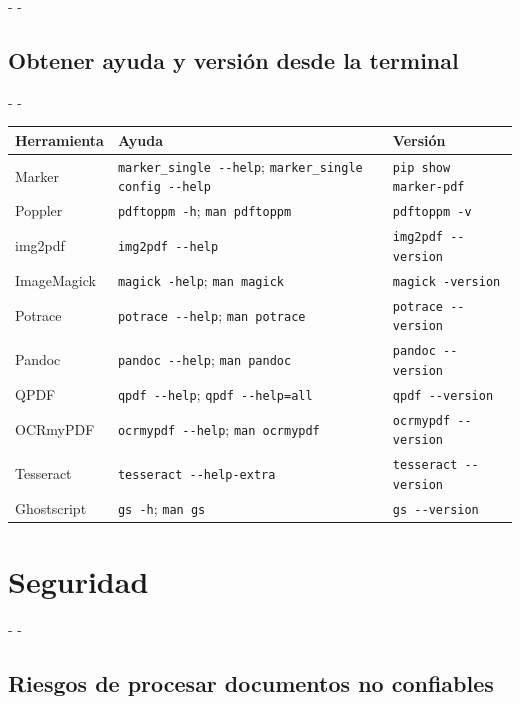 \documentclass[11pt,a4paper]{article}
\makeatletter
\newcommand{\necesitaespacio}[1]{\par\penalty-100\begingroup
	\setlength{\dimen@}{#1}\dimen@ii\pagegoal\advance\dimen@ii-\pagetotal
	\ifdim\dimen@>\dimen@ii\ifdim\dimen@ii>\z@\vfil\fi\penalty-\@M\fi\endgroup}
\newcommand{\cmd}[1]{\texttt{\textcolor{colcmd}{#1}}}      %
\newcommand{\cab}[1]{\textbf{#1}}
\makeatother
\begin{document}
	\necesitaespacio{22\baselineskip}
	\subsection{Obtener ayuda y versión desde la terminal}
	
	\begingroup\small
	\necesitaespacio{18\baselineskip}
	\begin{longtable}{L{2.6cm}L{6.06cm}L{6.4cm}}
		\toprule{}\cab{Herramienta} & \cab{Ayuda} & \cab{Versión}\\\midrule
		\endfirsthead
		\bottomrule
		\endfoot
		Marker & \cmd{marker\_\allowbreak{}single -{}-help}; \cmd{marker\_\allowbreak{}single config -{}-help} & \cmd{pip show marker-\allowbreak{}pdf}\\*
		Poppler & \cmd{pdftoppm -h}; \cmd{man pdftoppm} & \cmd{pdftoppm -v}\\
		img2pdf & \cmd{img2pdf -{}-help} & \cmd{img2pdf -{}-version}\\
		ImageMagick & \cmd{magick -help}; \cmd{man magick} & \cmd{magick -version}\\
		Potrace & \cmd{potrace -{}-help}; \cmd{man potrace} & \cmd{potrace -{}-version}\\
		Pandoc & \cmd{pandoc -{}-help}; \cmd{man pandoc} & \cmd{pandoc -{}-version}\\
		QPDF & \cmd{qpdf -{}-help}; \cmd{qpdf -{}-help=\allowbreak{}all} & \cmd{qpdf -{}-version}\\
		OCRmyPDF & \cmd{ocrmypdf -{}-help}; \cmd{man ocrmypdf} & \cmd{ocrmypdf -{}-version}\\
		Tesseract & \cmd{tesseract -{}-help-\allowbreak{}extra} & \cmd{tesseract -{}-version}\\*
		Ghostscript & \cmd{gs -h}; \cmd{man gs} & \cmd{gs -{}-version}\\
	\end{longtable}
	\endgroup
	
	\clearpage
	\section{Seguridad}\label{sec:seguridad}
	
	\necesitaespacio{12\baselineskip}
	\subsection{Riesgos de procesar documentos no confiables}
	
\end{document}
